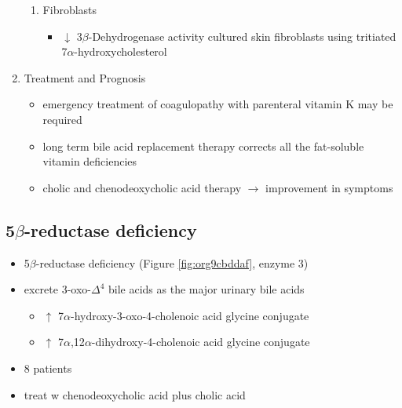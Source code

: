 \documentclass{scrartcl}
\begin{document}
\begin{enumerate}
\begin{enumerate}
\item Fibroblasts
\label{sec:org56ddd33}
\begin{itemize}
\item \(\downarrow\) 3\(\beta\)-Dehydrogenase activity cultured skin fibroblasts using
tritiated 7\(\alpha\)-hydroxycholesterol
\end{itemize}
\end{enumerate}

\item Treatment and Prognosis
\label{sec:org74483e1}
\begin{itemize}
\item emergency treatment of coagulopathy with parenteral vitamin K may be required
\item long term bile acid replacement therapy corrects all the fat-soluble
vitamin deficiencies

\item cholic and chenodeoxycholic acid therapy \(\to\) improvement in symptoms
\end{itemize}
\end{enumerate}

\subsection{5\(\beta\)-reductase deficiency}
\label{sec:orge0d833f}
\begin{itemize}
\item 5\(\beta\)-reductase deficiency (Figure \ref{fig:org9cbddaf}, enzyme 3)
\item excrete 3-oxo-\(\Delta^{\text{4}}\) bile acids as the major urinary bile acids
\begin{itemize}
\item \(\uparrow\) 7\(\alpha\)-hydroxy-3-oxo-4-cholenoic acid glycine conjugate
\item \(\uparrow\) 7\(\alpha\),12\(\alpha\)-dihydroxy-4-cholenoic acid glycine conjugate
\end{itemize}
\item 8 patients
\item treat w chenodeoxycholic acid plus cholic acid
\end{itemize}
\end{document}
